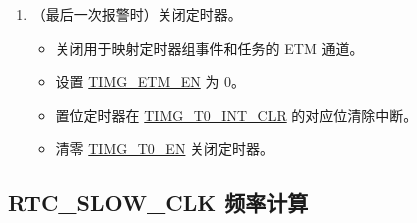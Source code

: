 \documentclass[main\_\_CN.tex]{subfiles}
\begin{document}
\begin{enumerate}
\begin{itemize}
    \end{itemize}
    \item （最后一次报警时）关闭定时器。
    \begin{itemize}
        \item 关闭用于映射定时器组事件和任务的 ETM 通道。
        \item 设置 \hyperref[fielddesc:TIMGETMEN]{TIMG\_ETM\_EN} 为 0。
        \item 置位定时器在 \hyperref[fielddesc:TIMGT0INTCLR]{TIMG\_T0\_INT\_CLR} 的对应位清除中断。
        \item 清零 \hyperref[fielddesc:TIMGTXEN]{TIMG\_T0\_EN} 关闭定时器。
    \end{itemize}
\end{enumerate}

\subsection{RTC\_SLOW\_CLK 频率计算}\label{sec:rtc-calibration-procedure}
\end{document}
